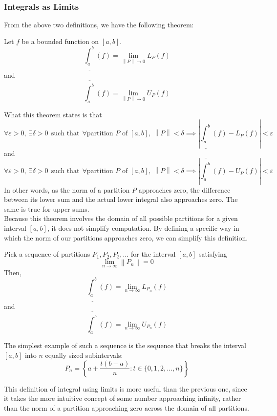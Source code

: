 \documentclass[10pt]{article}
\newenvironment{theorem}[1][]{\begin{tcolorbox}[colframe=_blue,colback=_blue2,title=Theorem. \ifthenelse{\isempty{#1}}{}{(#1)}
]}{\end{tcolorbox}}
\newcommand\norm[1]{\left\lVert#1\right\rVert}
\newcommand{\hr}{\noindent\makebox[\linewidth]{\rule{\textwidth}{0.4pt}}\par\vspace{0.1in}}
\newcommand{\emptyline}[0]{\\\hfill$~$\\}
\begin{document}
\subsubsection{Integrals as Limits}
From the above two definitions, we have the following theorem:
\begin{theorem}
    Let $f$ be a bounded function on $[a,b]$.
    $$
        \underline{\int_a^b}(f)=\lim_{\norm{P}\to 0} L_P(f)
    $$
    and
    $$
        \overline{\int_a^b}(f)=\lim_{\norm{P}\to 0} U_P(f)
    $$
\end{theorem}
What this theorem states is that
$$
    \forall \varepsilon>0,~\exists \delta>0~~\text{such that}~~\forall\text{partition $P$ of $[a,b]$},~\norm{P}<\delta\implies \left|\underline{\int_a^b}(f)-L_P(f)\right|<\varepsilon
$$
and
$$
    \forall \varepsilon>0,~\exists \delta>0~~\text{such that}~~\forall\text{partition $P$ of $[a,b]$},~\norm{P}<\delta\implies \left|\overline{\int_a^b}(f)-U_P(f)\right|<\varepsilon
$$
In other words, as the norm of a partition $P$ approaches zero, the difference between its lower sum and the actual lower integral also approaches zero. The same is true for upper sums.
\emptyline
Because this theorem involves the domain of all possible partitions for a given interval $[a,b]$, it does not simplify computation. By defining a specific way in which the norm of our partitions approaches zero, we can simplify this definition.
\begin{theorem}
    Pick a sequence of partitions $P_1,P_2,P_3,\dots$ for the interval $[a,b]$ satisfying
    $$
        \lim_{n\to\infty}\norm{P_n}=0
    $$
    Then,
    $$
        \underline{\int_a^b}(f)=\lim_{n\to\infty}L_{P_n}(f)
    $$
    and
    $$
        \overline{\int_a^b}(f)=\lim_{n\to\infty}U_{P_n}(f)
    $$
    \hr
    The simplest example of such a sequence is the sequence that breaks the interval $[a,b]$ into $n$ equally sized subintervals:
    $$
        P_n=\left\{a+\frac{t(b-a)}{n}:t\in\{0,1,2,\dots,n\}\right\}
    $$
\end{theorem}
This definition of integral using limits is more useful than the previous one, since it takes the more intuitive concept of some number approaching infinity, rather than the norm of a partition approaching zero across the domain of all partitions.
\end{document}
